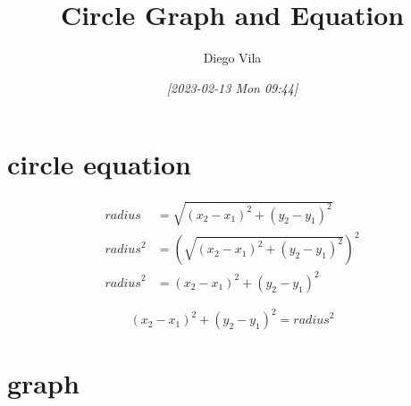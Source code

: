 \documentclass[11pt]{article}
\author{Diego Vila}
\date{\textit{[2023-02-13 Mon 09:44]}}
\title{Circle Graph and Equation}
\begin{document}
\maketitle
\tableofcontents


\section{circle equation}
\label{sec:orgae471af}

\begin{align*}
radius &= \sqrt{(x_2 - x_1)^2 + (y_2 - y_1)^2}\\
{radius}^2 &= (\sqrt{(x_2 - x_1)^2 + (y_2 - y_1)^2})^2\\
{radius}^2 &= (x_2 - x_1)^2 + (y_2 - y_1)^2
\end{align*}

$$
(x_2 - x_1)^2 + (y_2 - y_1)^2 = {radius}^2
$$



\section{graph}
\label{sec:orgb0afa18}

\end{document}
